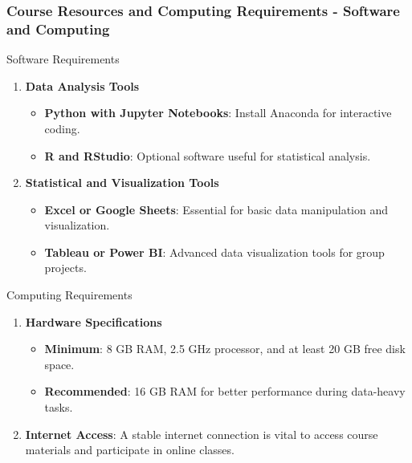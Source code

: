 \documentclass[aspectratio=169]{beamer}
\begin{document}
\begin{frame}[fragile]
    \frametitle{Course Resources and Computing Requirements - Software and Computing}
    \begin{block}{Software Requirements}
        \begin{enumerate}
            \item \textbf{Data Analysis Tools}
            \begin{itemize}
                \item \textbf{Python with Jupyter Notebooks}: Install Anaconda for interactive coding.
                \item \textbf{R and RStudio}: Optional software useful for statistical analysis.
            \end{itemize}

            \item \textbf{Statistical and Visualization Tools}
            \begin{itemize}
                \item \textbf{Excel or Google Sheets}: Essential for basic data manipulation and visualization.
                \item \textbf{Tableau or Power BI}: Advanced data visualization tools for group projects.
            \end{itemize}
        \end{enumerate}
    \end{block}

    \begin{block}{Computing Requirements}
        \begin{enumerate}
            \item \textbf{Hardware Specifications}
            \begin{itemize}
                \item \textbf{Minimum}: 8 GB RAM, 2.5 GHz processor, and at least 20 GB free disk space.
                \item \textbf{Recommended}: 16 GB RAM for better performance during data-heavy tasks.
            \end{itemize}

            \item \textbf{Internet Access}: A stable internet connection is vital to access course materials and participate in online classes.
        \end{enumerate}
    \end{block}
\end{frame}
\end{document}
